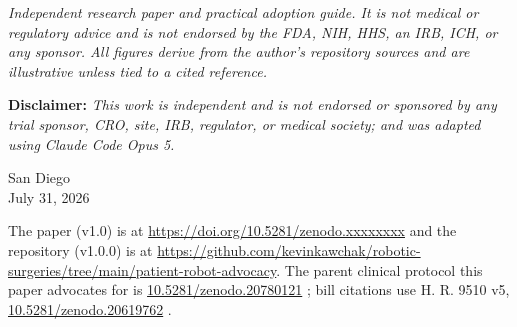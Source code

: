 \documentclass[11pt]{article}
\begin{document}
\parule{0.5pt}

\vspace{0.2em}

\noindent\footnotesize\textit{Independent research paper and practical adoption
guide. It is not medical or regulatory advice and is not endorsed by the FDA,
NIH, HHS, an IRB, ICH, or any sponsor. All figures derive from the author's
repository sources and are illustrative unless tied to a cited reference.}
\normalsize\par

\vspace{0.2em}

\noindent\footnotesize\textbf{Disclaimer:} \textit{This work is independent and
is not endorsed or sponsored by any trial sponsor, CRO, site, IRB, regulator, or
medical society; and was adapted using Claude Code Opus 5.}\normalsize\par

\vspace{0.3em}

\begin{center}\small
San Diego \\ July 31, 2026
\end{center}

\vspace{0.2em}

\noindent\footnotesize The paper (v1.0) is at
\href{https://doi.org/10.5281/zenodo.xxxxxxxx}{https://doi.org/10.5281/zenodo.xxxxxxxx}
and the repository (v1.0.0) is at
\href{https://github.com/kevinkawchak/robotic-surgeries/tree/main/patient-robot-advocacy}{https://github.com/kevinkawchak/robotic-surgeries/tree/main/patient-robot-advocacy}.
The parent clinical protocol this paper advocates for is
\href{https://doi.org/10.5281/zenodo.20780121}{10.5281/zenodo.20780121}
\cite{onpremwhippl}; bill citations use H. R. 9510 v5,
\href{https://doi.org/10.5281/zenodo.20619762}{10.5281/zenodo.20619762}
\cite{hr9510billv5}.\normalsize\par

\renewcommand{\keywordname}{\textbf{Keywords}}

\vspace{0.4em}
\parule{0.6pt}

\renewcommand{\contentsname}{\color{accentcol}Table of Contents}
{\setlength{\parskip}{0pt}\footnotesize\linespread{0.92}\selectfont\tableofcontents}
\end{document}
